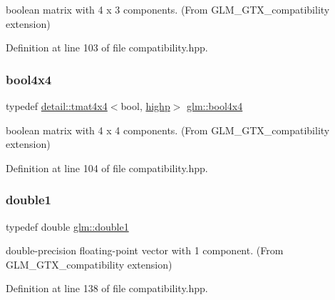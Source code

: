 boolean matrix with 4 x 3 components. (From G\+L\+M\+\_\+\+G\+T\+X\+\_\+compatibility extension) 



Definition at line 103 of file compatibility.\+hpp.

\mbox{\label{group__gtx__compatibility_ga4738dad3625bfa64ddf218897da020e9}} 
\subsubsection{\texorpdfstring{bool4x4}{bool4x4}}
{\footnotesize\ttfamily typedef \hyperlink{structglm_1_1detail_1_1tmat4x4}{detail\+::tmat4x4}$<$bool, \hyperlink{namespaceglm_a0f04f086094c747d227af4425893f545ac6f7eab42eacbb10d59a58e95e362074}{highp}$>$ \hyperlink{group__gtx__compatibility_ga4738dad3625bfa64ddf218897da020e9}{glm\+::bool4x4}}



boolean matrix with 4 x 4 components. (From G\+L\+M\+\_\+\+G\+T\+X\+\_\+compatibility extension) 



Definition at line 104 of file compatibility.\+hpp.

\mbox{\label{group__gtx__compatibility_gab8b88350212cea916857cb2f49b8a29f}} 
\subsubsection{\texorpdfstring{double1}{double1}}
{\footnotesize\ttfamily typedef double \hyperlink{group__gtx__compatibility_gab8b88350212cea916857cb2f49b8a29f}{glm\+::double1}}



double-\/precision floating-\/point vector with 1 component. (From G\+L\+M\+\_\+\+G\+T\+X\+\_\+compatibility extension) 



Definition at line 138 of file compatibility.\+hpp.

